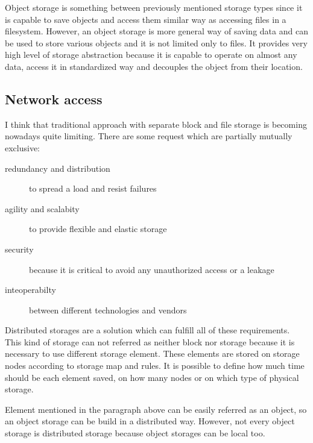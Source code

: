 Object storage is something between previously mentioned storage types since it is capable to save objects and access them similar way as accessing files in a filesystem. However, an object storage is more general way of saving data and can be used to store various objects and it is not limited only to files. It provides very high level of storage abstraction because it is capable to operate on almost any data, access it in standardized way and decouples the object from their location.
\label{par:object-storage}


\subsection{Network access}
I think that traditional approach with separate block and file storage is becoming nowadays quite limiting. There are some request which are partially mutually exclusive:
\begin{description}
	\item[redundancy and distribution] to spread a load and resist failures
	\item[agility and scalabity] to provide flexible and elastic storage
	\item[security] because it is critical to avoid any unauthorized access or a leakage
	\item[inteoperabilty] between different technologies and vendors
\end{description}

Distributed storages are a solution which can fulfill all of these requirements. This kind of storage can not referred as neither block nor storage because it is necessary to use different storage element. These elements are stored on storage nodes according to storage map and rules. It is possible to define how much time should be each element saved, on how many nodes or on which type of physical storage.

Element mentioned in the paragraph above can be easily referred as an object, so an object storage can be build in a distributed way. However, not every object storage is distributed storage because object storages can be local too.

